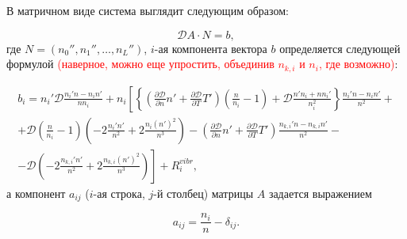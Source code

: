 \documentclass[12pt]{article}
\begin{document}
В матричном виде система выглядит следующим образом:

\begin{equation}
  \mathcal{D} A \cdot N = b,
\end{equation}
где $N=\left(n_{0}'', n_{1}'', \ldots, n_{L}''\right)$, $i$-ая компонента вектора $b$ определяется следующей формулой \textcolor{red}{(наверное, можно еще упростить, объединив $n_{k,i}$ и $n_{i}$, где возможно)}:

\begin{multline}
  b_{i} = n_{i}' \mathcal{D} \frac{n_{i}'n - n_{i}n'}{n n_{i}} + n_{i} \left[\left\{\left(\frac{\partial \mathcal{D}}{\partial n}n' + \frac{\partial \mathcal{D}}{\partial T}T' \right)\left(\frac{n}{n_{i}} - 1 \right) 
  + \mathcal{D} \frac{n'n_{i} + n n_{i}'}{n_{i}^2} \right\} \frac{n_{i}'n - n_{i}n'}{n^2} \right. + \\
  + \mathcal{D} \left(\frac{n}{n_{i}} - 1\right) \left( - 2\frac{n_{i}'n'}{n^2} + 2\frac{n_{i}\left(n' \right)^2}{n^3} \right)
  - \left(\frac{\partial \mathcal{D}}{\partial n}n' + \frac{\partial \mathcal{D}}{\partial T}T' \right) \frac{n_{k,i}'n - n_{k,i}n'}{n^2} - \\
  - \left.\mathcal{D} \left(- 2\frac{n_{k,i}'n'}{n^2}+ 2\frac{n_{k,i}\left(n' \right)^2}{n^3} \right) \right] + R_{i}^{vibr},
\end{multline}
а компонент $a_{ij}$ ($i$-ая строка, $j$-й столбец) матрицы $A$ задается выражением

\begin{equation}
  a_{ij} = \frac{n_{i}}{n} - \delta_{ij}.
\end{equation}




\end{document}
